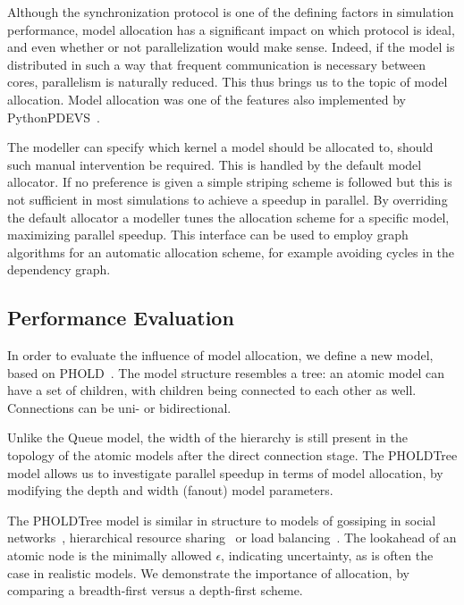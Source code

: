 Although the synchronization protocol is one of the defining factors in simulation performance, model allocation has a significant impact on which protocol is ideal, and even whether or not parallelization would make sense.
Indeed, if the model is distributed in such a way that frequent communication is necessary between cores, parallelism is naturally reduced.
This thus brings us to the topic of model allocation.
Model allocation was one of the features also implemented by PythonPDEVS~\cite{PythonPDEVS2}.

The modeller can specify which kernel a model should be allocated to, should such manual intervention be required.
This is handled by the default model allocator.
If no preference is given a simple striping scheme is followed but this is not sufficient in most simulations to achieve a speedup in parallel.
By overriding the default allocator a modeller tunes the allocation scheme for a specific model, maximizing parallel speedup.
This interface can be used to employ graph algorithms for an automatic allocation scheme, for example avoiding cycles in the dependency graph.

\subsection{Performance Evaluation}
In order to evaluate the influence of model allocation, we define a new model, based on PHOLD~\cite{PHOLD}.
The model structure resembles a tree: an atomic model can have a set of children, with children being connected to each other as well.
Connections can be uni- or bidirectional.

Unlike the Queue model, the width of the hierarchy is still present in the topology of the atomic models after the direct connection stage.
The PHOLDTree model allows us to investigate parallel speedup in terms of model allocation, by modifying the depth and width (fanout) model parameters.

The PHOLDTree model is similar in structure to models of gossiping in social networks~\cite{?}, hierarchical resource sharing~\cite{?} or load balancing~\cite{?}.
The lookahead of an atomic node is the minimally allowed $\epsilon$, indicating uncertainty, as is often the case in realistic models.
We demonstrate the importance of allocation, by comparing a breadth-first versus a depth-first scheme.

